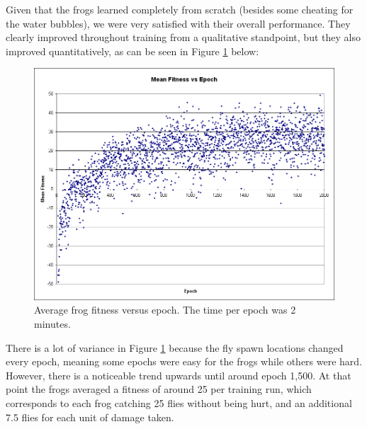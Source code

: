 Given that the frogs learned completely from scratch (besides some cheating for the water bubbles), we were very satisfied with their overall performance. They clearly improved throughout training from a qualitative standpoint, but they also improved quantitatively, as can be seen in Figure \ref{fig:FrogFitness} below:

\begin{figure}[!htbp]
    \centering
    \includegraphics[scale=0.55]{Figs/FrogFitness.png}
    \caption{Average frog fitness versus epoch. The time per epoch was 2 minutes.}
    \label{fig:FrogFitness}
\end{figure}

There is a lot of variance in Figure \ref{fig:FrogFitness} because the fly spawn locations changed every epoch, meaning some epochs were easy for the frogs while others were hard. However, there is a noticeable trend upwards until around epoch 1,500. At that point the frogs averaged a fitness of around 25 per training run, which corresponds to each frog catching 25 flies without being hurt, and an additional 7.5 flies for each unit of damage taken.